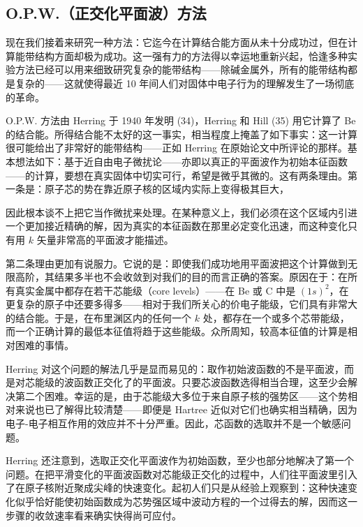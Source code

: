 
\subsection{O.P.W.（正交化平面波）方法}


现在我们接着来研究一种方法：它迄今在计算结合能方面从未十分成功过，但在计算能带结构方面却极为成功。这一强有力的方法得以幸运地重新兴起，恰逢多种实验方法已经可以用来细致研究复杂的能带结构——除碱金属外，所有的能带结构都是复杂的——这就使得最近 10 年间人们对固体中电子行为的理解发生了一场彻底的革命。

O.P.W. 方法由 Herring 于 1940 年发明 (34)，Herring 和 Hill (35) 用它计算了 Be 的结合能。所得结合能不太好的这一事实，相当程度上掩盖了如下事实：这一计算很可能给出了非常好的能带结构——正如 Herring 在原始论文中所评论的那样。基本想法如下：基于近自由电子微扰论——亦即以真正的平面波作为初始本征函数——的计算，要想在真实固体中切实可行，希望是微乎其微的。这有两条理由。第一条是：原子芯的势在靠近原子核的区域内实际上变得极其巨大，

因此根本谈不上把它当作微扰来处理。在某种意义上，我们必须在这个区域内引进一个更加接近精确的解，因为真实的本征函数在那里必定变化迅速，而这种变化只有用 $k$ 矢量非常高的平面波才能描述。

第二条理由更加有说服力。它说的是：即使我们成功地用平面波把这个计算做到无限高阶，其结果多半也不会收敛到对我们的目的而言正确的答案。原因在于：在所有真实金属中都存在若干芯能级（core levels）——在 Be 或 C 中是 $(1s)^2$，在更复杂的原子中还要多得多——相对于我们所关心的价电子能级，它们具有非常大的结合能。于是，在布里渊区内的任何一个 $k$ 处，都存在一个或多个芯带能级，而一个正确计算的最低本征值将趋于这些能级。众所周知，较高本征值的计算是相对困难的事情。

Herring 对这个问题的解法几乎是显而易见的：取作初始波函数的不是平面波，而是对芯能级的波函数正交化了的平面波。只要芯波函数选得相当合理，这至少会解决第二个困难。幸运的是，由于芯能级大多位于来自原子核的强势区——这个势相对来说也已了解得比较清楚——即便是 Hartree 近似对它们也确实相当精确，因为电子-电子相互作用的效应并不十分严重。因此，芯函数的选取并不是一个敏感问题。

Herring 还注意到，选取正交化平面波作为初始函数，至少也部分地解决了第一个问题。在把平滑变化的平面波函数对芯能级正交化的过程中，人们往平面波里引入了在原子核附近聚成尖峰的快速变化。起初人们只是从经验上观察到：这种快速变化似乎恰好能使初始函数成为芯势强区域中波动方程的一个过得去的解，因而这一步骤的收敛速率看来确实快得尚可应付。

